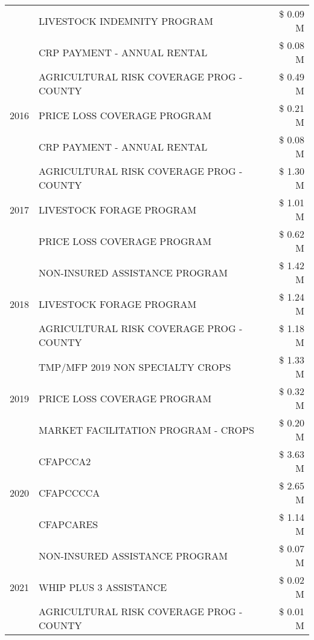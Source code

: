 \begin{tabular}{llr}
 & LIVESTOCK INDEMNITY PROGRAM & \$ 0.09 M \\
 & CRP PAYMENT - ANNUAL RENTAL & \$ 0.08 M \\
\cline{1-3}
\multirow[t]{3}{*}{2016} & AGRICULTURAL RISK COVERAGE PROG - COUNTY & \$ 0.49 M \\
 & PRICE LOSS COVERAGE PROGRAM & \$ 0.21 M \\
 & CRP PAYMENT - ANNUAL RENTAL & \$ 0.08 M \\
\cline{1-3}
\multirow[t]{3}{*}{2017} & AGRICULTURAL RISK COVERAGE PROG - COUNTY & \$ 1.30 M \\
 & LIVESTOCK FORAGE PROGRAM & \$ 1.01 M \\
 & PRICE LOSS COVERAGE PROGRAM & \$ 0.62 M \\
\cline{1-3}
\multirow[t]{3}{*}{2018} & NON-INSURED ASSISTANCE PROGRAM & \$ 1.42 M \\
 & LIVESTOCK FORAGE PROGRAM & \$ 1.24 M \\
 & AGRICULTURAL RISK COVERAGE PROG - COUNTY & \$ 1.18 M \\
\cline{1-3}
\multirow[t]{3}{*}{2019} & TMP/MFP 2019 NON SPECIALTY CROPS & \$ 1.33 M \\
 & PRICE LOSS COVERAGE PROGRAM & \$ 0.32 M \\
 & MARKET FACILITATION PROGRAM - CROPS & \$ 0.20 M \\
\cline{1-3}
\multirow[t]{3}{*}{2020} & CFAPCCA2 & \$ 3.63 M \\
 & CFAPCCCCA & \$ 2.65 M \\
 & CFAPCARES & \$ 1.14 M \\
\cline{1-3}
\multirow[t]{3}{*}{2021} & NON-INSURED ASSISTANCE PROGRAM & \$ 0.07 M \\
 & WHIP PLUS 3 ASSISTANCE & \$ 0.02 M \\
 & AGRICULTURAL RISK COVERAGE PROG - COUNTY & \$ 0.01 M \\
\cline{1-3}
\bottomrule
\end{tabular}
